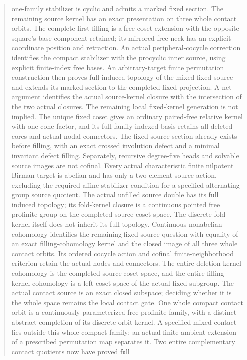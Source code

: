 \documentclass[11pt,a4paper]{article}
\begin{document}
\begin{abstract}
one-family stabilizer is cyclic and admits a marked fixed section.
The remaining source kernel has an exact presentation on three whole
contact orbits. The complete first filling is a free-coset extension
with the opposite square's base component retained; its mirrored free
neck has an explicit coordinate position and retraction. An actual
peripheral-cocycle correction identifies the compact stabilizer with
the procyclic inner source, using explicit finite-index free bases.
An arbitrary-target finite permutation construction then proves full
induced topology of the mixed fixed source and extends its marked
section to the completed fixed projection. A net argument identifies
the actual source-kernel closure with the intersection of the two
actual closures. The remaining local fixed-kernel generation is not
implied.
The unique fixed coset gives an ordinary paired-free relative kernel
with one cone factor, and its full family-indexed basis retains all
deleted cores and actual nodal connectors. The fixed-source section
already exists before filling, with an exact crossed involution defect
and a minimal invariant defect filling. Separately, recursive degree-five
heads and solvable source images are not cofinal. Every actual
characteristic finite nilpotent Birman target is abelian and has only
a two-element source action, excluding the required affine stabilizer
condition for a specified alternating-group source quotient.
The actual unfilled source double has its full induced topology; its
fold-kernel closure is a continuous pointed free profinite group on
the completed source coset space. The discrete fold kernel itself
does not inherit its full topology. Continuous nonabelian cohomology
identifies the remaining fixed-source question with equality of an
exact filling-cohomology kernel and the closed image of all three
whole contact orbits. Its ordered cocycle action and cofinal
finite-neighborhood criterion retain the actual nodes and connectors.
The entire deletion-kernel cohomology is the completed source coset
space, and the entire filling-kernel cohomology is a left-coset
space of the actual fixed subgroup. The actual contact source
is an exact closed subspace; deciding whether it is the whole
space remains the local contact gate.
One whole compact contact orbit is a continuously parameterized
free profinite family, with a distinct abstract completion of its
discrete orbit kernel. A specified mixed contact lies outside this
whole compact family; an actual finite ambient extension of a
prescribed permutation map separates it.
Two entire complementary contact quotients now have proved full

\end{abstract}
\end{document}
